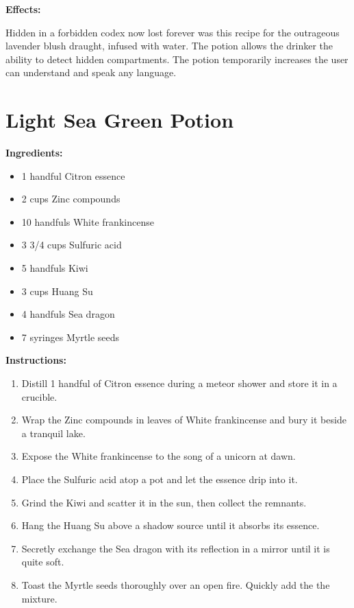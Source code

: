 \documentclass{article}
\begin{document}
\textbf{Effects:}

Hidden in a forbidden codex now lost forever was this recipe for the outrageous lavender blush draught, infused with water. The potion allows the drinker the ability to detect hidden compartments. The potion temporarily increases the user can understand and speak any language.

\newpage
\section*{Light Sea Green Potion}

\textbf{Ingredients:}

\begin{itemize}
  \item 1 handful Citron essence
  \item 2 cups Zinc compounds
  \item 10 handfuls White frankincense
  \item 3 3/4 cups Sulfuric acid
  \item 5 handfuls Kiwi
  \item 3 cups Huang Su
  \item 4 handfuls Sea dragon
  \item 7 syringes Myrtle seeds
\end{itemize}

\textbf{Instructions:}

\begin{enumerate}
  \item Distill 1 handful of Citron essence during a meteor shower and store it in a crucible.
  \item Wrap the Zinc compounds in leaves of White frankincense and bury it beside a tranquil lake.
  \item Expose the White frankincense to the song of a unicorn at dawn.
  \item Place the Sulfuric acid atop a pot and let the essence drip into it.
  \item Grind the Kiwi and scatter it in the sun, then collect the remnants.
  \item Hang the Huang Su above a shadow source until it absorbs its essence.
  \item Secretly exchange the Sea dragon with its reflection in a mirror until it is quite soft.
  \item Toast the Myrtle seeds thoroughly over an open fire. Quickly add the the mixture.
\end{enumerate}
\end{document}
